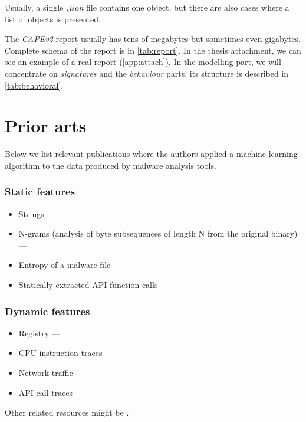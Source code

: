 Usually, a single \emph{.json} file contains one object, but there are also cases where a list of objects is presented.

The \emph{CAPEv2} report usually has tens of megabytes but sometimes even gigabytes. Complete schema of the report is in \ref{tab:report}. In the thesis attachment, we can see an example of a real report (\ref{app:attach}). In the modelling part, we will concentrate on \emph{signatures} and the \emph{behaviour} parts, its structure is described in \ref{tab:behavioral}.

\section{Prior arts}
Below we list relevant publications where the authors applied a machine learning algorithm to the data produced by malware analysis tools.
\subsubsection*{Static features}
\begin{itemize}
  \itemsep0em 
  \item Strings ---  \cite{Lee2011}
  \item N-grams (analysis of byte subsequences of length N from the original binary) ---  \cite{Fuyong2017}
  \item Entropy of a malware file ---  \cite{Wojnowicz2018}
  \item Statically extracted API function calls ---  \cite{Ahmadi2016}
\end{itemize}

\subsubsection*{Dynamic features}
\begin{itemize}
  \itemsep0em 
  \item Registry ---  \cite{Ghiasi2015}
  \item CPU instruction traces ---  \cite{Carlin2017}
  \item Network traffic ---  \cite{Boukhtouta2015}
  \item API call traces ---   \cite{Galal2015}
\end{itemize}

Other related resources might be \cite{Singh2020, Sethi2019, Abdessadki2019, Gibert2020}.